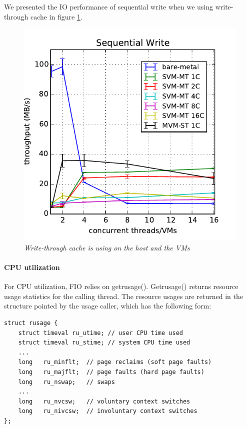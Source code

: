 \documentclass{acmsig}
\begin{document}
We presented the IO performance of sequential write when we using write-through cache in figure \ref{fig:throughputwritethrough}.

\begin{figure}[htbp]
  \centering
  \includegraphics[scale=0.7]{figures/throughputwritethrough.pdf}
  \caption{\textit{Write-through cache is using on the host and the VMs}}
  \label{fig:throughputwritethrough}
\end{figure}


\paragraph{CPU utilization}

For CPU utilization, FIO relies on getrusage(). Getrusage() returns resource usage statistics for the calling thread. The resource usages are returned in the structure pointed by the usage caller, which has the following form:

\begin{lstlisting}
struct rusage {
    struct timeval ru_utime; // user CPU time used
    struct timeval ru_stime; // system CPU time used
    ...
    long   ru_minflt;  // page reclaims (soft page faults)
    long   ru_majflt;  // page faults (hard page faults)
    long   ru_nswap;   // swaps
    ...
    long   ru_nvcsw;   // voluntary context switches
    long   ru_nivcsw;  // involuntary context switches
};
\end{lstlisting}
\end{document}

